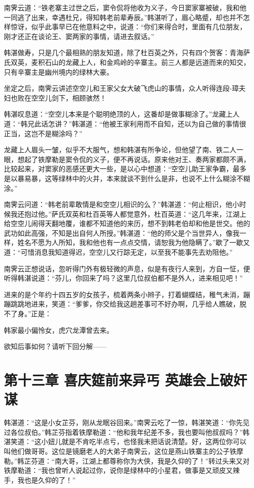 \documentclass[12pt,oneside]{book}
\begin{document}
南霁云道：``铁老寨主过世之后，窦令侃将他收为义子，今日窦家寨被破，我和他一同逃了出来，幸遇杜兄，得知韩老前辈寿辰。''韩湛听了，眉心略蹙，却也并不怎样惊讶，似乎此事早已在他意料之中，说道：``你们来得合时，里面有几位朋友，刚才还正在谈论王、窦两家的事情，请进去叙话。''

韩湛做寿，只是几个最相熟的朋友知道，除了杜百英之外，只有四个贺客：青海萨氏双英，麦积石山的龙藏上人，和金鸡岭的辛寨主。前三人都是远道而来的知交，只有辛寨主是幽州境内的绿林大豪。

坐定之后，南霁云讲述空空儿和王家父女大破飞虎山的事情，众人听得连段-璋夫妇也败在空空儿剑下，相顾骇然！

韩湛叹息道：``空空儿本来是个聪明绝顶的人，这番却是做事糊涂了。''龙藏上人道：``韩兄此话怎讲？''韩湛道：``他被王家利用而不自知，还以为自己做的事情很正当，这岂不是糊涂吗？''

龙藏上人眉头一皱，似乎不大服气，想和韩湛有所争论，但他望了南、铁二人一眼，想起了铁摩勒是窦令侃的义子，便不再说话。原来他对王、奏两家都颇不满，比较起来，对窦家的恶感还更大一些，是以心中想道：``空空儿助王家争霸，最多是以暴易暴，这等绿林中的火并，本来就谈不到什么是非，也说不上什么糊涂不糊涂。''

南霁云问道：``韩老前辈敢情是和空空儿相识的么？''韩湛道：``何止相识，他小时候我还抱过他。''萨氏双英和杜百英等人都觉意外，杜百英道：``这几年来，江湖上给空空儿闹得天翻地覆，谁都不知道他的来历，想不到韩老伯却和他是世交。他的武功如此高强，不知是出自何人所授。''韩湛道：``他的师父是个当世异人，像我一样，姓名不愿为人所知，我和他也有一点点交情，请恕我为他隐瞒了。''歇了一歇又道：``可惜消息我知道得迟，空空儿又行踪无定，以至我不能事先去劝阻他。''

南霁云正想说话，忽听得门外有极轻微的声息，似是有夜行人来到，方自一怔，便听得韩湛说道：``芬儿，你回来了吗？这里几位叔伯都不是外人，进来相见吧！''

进来的是个年约十四五岁的女孩子，梳着两条小辫子，打着蝴蝶结，稚气未消，蹦蹦跳跳地进来，笑道：``爹爹，你交给我这趟差事可不好办啊，几乎给人瞧破，脱不了身。''正是：

韩家最小偏怜女，虎穴龙潭曾去来。

欲知后事如何？请听下回分解------

\chapter{第十三章 喜庆筵前来异丐
英雄会上破奸谋}\label{ux7b2cux5341ux4e09ux7ae0-ux559cux5e86ux7b75ux524dux6765ux5f02ux4e10-ux82f1ux96c4ux4f1aux4e0aux7834ux5978ux8c0b}

韩湛道：``这是小女芷芬，刚从龙眠谷回来。''南霁云吃了一惊，韩湛笑道：``你先见过各位叔伯。''韩芷芬指着铁摩勒道：``他和我年纪差不多，我也要叫他叔叔吗？''韩湛笑道：``这小妞儿就是不肯吃半点亏，也怪我未把话说清楚。好，这两位你可以叫他们做哥哥。这位是镜磨老人的大弟子南霁云，这位是燕山铁寨主的公子铁摩勒。''韩芷芬道：``南大哥，江湖上都尊称你为大侠，我是久仰的了！''转过头来又对铁摩勒道：``我也曾听人说起过你，说你是绿林中的小星君，做事是又顽皮又辣手，我也是久仰的了！''
\end{document}
